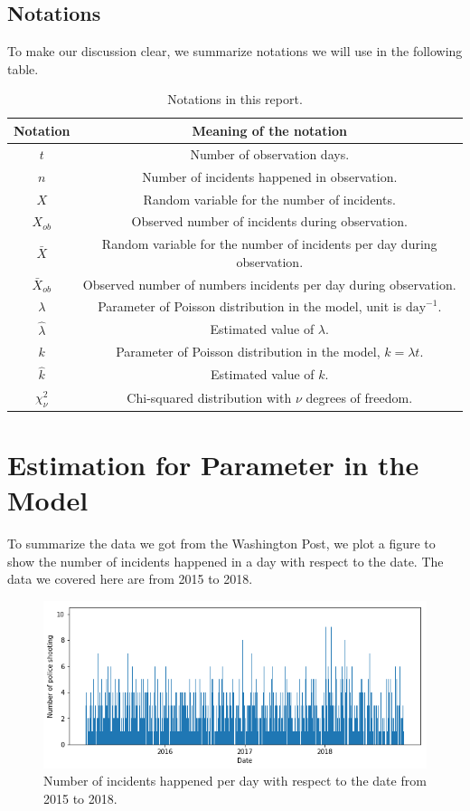 \documentclass[11pt,a4paper,english]{article}
\begin{document}
\subsection{Notations}
To make our discussion clear, we summarize notations we will use in the following table.
\begin{table}[htbp]
	\centering
	\caption{Notations in this report.}
	\begin{tabular}{cc}
		\hline
		Notation & Meaning of the notation\\
		\hline
		$t$ & Number of observation days.\\
		$n$ & Number of incidents happened in observation.\\
		$X$ & Random variable for the number of incidents.\\
		$X_{ob}$ & Observed number of incidents during observation.\\
		$\bar{X}$ & Random variable for the number of incidents per day during observation.\\
		$\bar{X}_{ob}$ & Observed number of numbers incidents per day during observation.\\
		$\lambda$ & Parameter of Poisson distribution in the model, unit is $\text{day}^{-1}$.\\
		$\hat{\lambda}$ & Estimated value of $\lambda$.\\
		$k$ & Parameter of Poisson distribution in the model, $k = \lambda t$.\\
		$\hat{k}$ & Estimated value of $k$.\\
		$\chi_{\nu}^{2}$ & Chi-squared distribution with $\nu$ degrees of freedom.\\
		\hline
	\end{tabular}
\end{table}
\section{Estimation for Parameter in the Model}
To summarize the data we got from the Washington Post, we plot a figure to show the number of incidents happened in a day with respect to the date. The data we covered here are from 2015 to 2018.
\begin{figure}[htbp]
	\centering
	\includegraphics[width = \textwidth]{1.png}
    \caption{Number of incidents happened per day with respect to the date from 2015 to 2018.}
\end{figure}
\end{document}
